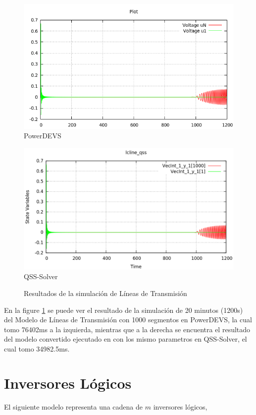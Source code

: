 \begin{figure}[H]
\centering
\begin{minipage}{0.5\textwidth}
\includegraphics[width=\linewidth]{lcline-pd}
PowerDEVS\\
\end{minipage}\hfill
\begin{minipage}{0.5\textwidth}
 \includegraphics[width=\linewidth]{lcline-qss}
QSS-Solver\\
\end{minipage}
\caption{Resultados de la simulación de Líneas de Transmisión}
\label{graph:lclines}
\end{figure}

En la figure \ref{graph:lclines} se puede ver el resultado de la simulación de 20 minutos (1200s) del Modelo de Líneas de Transmisión con 1000 segmentos en PowerDEVS,
	la cual tomo 76402ms a la izquierda, mientras que a la derecha se encuentra el resultado del modelo convertido ejecutado en con los mismo parametros en
	QSS-Solver, el cual tomo 34982.5ms.

\section{Inversores Lógicos}
	El siguiente modelo representa una cadena de $m$ inversores lógicos, 


